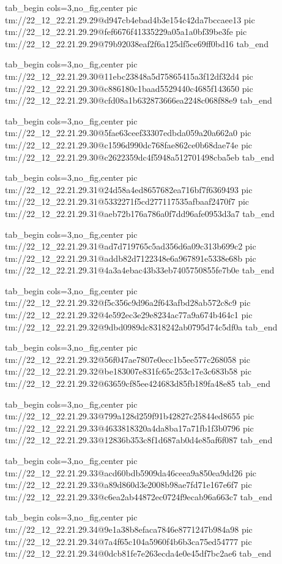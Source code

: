 \ifcmt
  tab_begin cols=3,no_fig,center
    pic tm://22_12_22.21.29.29@d947cb4ebad4b3e154c42da7bccaee13
    pic tm://22_12_22.21.29.29@fef6676f41335229a05a1a0bf39be3fe
    pic tm://22_12_22.21.29.29@79b92038eaf2f6a125df5ce69ff0bd16
  tab_end
\fi


\ifcmt
  tab_begin cols=3,no_fig,center
    pic tm://22_12_22.21.29.30@11ebc23848a5d75865415a3f12df32d4
    pic tm://22_12_22.21.29.30@c886180c1baad5529440c4685f143650
    pic tm://22_12_22.21.29.30@cfd08a1b632873666ea2248c068f88e9
  tab_end
\fi


\ifcmt
  tab_begin cols=3,no_fig,center
    pic tm://22_12_22.21.29.30@5fae63ceef33307edbda059a20a662a0
    pic tm://22_12_22.21.29.30@c1596d990dc768fae862ce0b68dae74e
    pic tm://22_12_22.21.29.30@c2622359dc4f5948a512701498cba5eb
  tab_end
\fi


\ifcmt
  tab_begin cols=3,no_fig,center
    pic tm://22_12_22.21.29.31@24d58a4ed8657682ea716bf7f6369493
    pic tm://22_12_22.21.29.31@5332271f5cd277117535afbaaf2470f7
    pic tm://22_12_22.21.29.31@aeb72b176a786a0f7dd96afe0953d3a7
  tab_end
\fi


\ifcmt
  tab_begin cols=3,no_fig,center
    pic tm://22_12_22.21.29.31@ad7d719765c5ad356d6a09c313b699c2
    pic tm://22_12_22.21.29.31@addb82d7122348e6a967891e5338e68b
    pic tm://22_12_22.21.29.31@4a3a4ebac43b33eb7405750855fe7b0e
  tab_end
\fi


\ifcmt
  tab_begin cols=3,no_fig,center
    pic tm://22_12_22.21.29.32@f5c356c9d96a2f643afbd28ab572c8c9
    pic tm://22_12_22.21.29.32@4e592ec3e29e8234ac77a9a674b464c1
    pic tm://22_12_22.21.29.32@9dbd0989dc8318242ab0795d74c5df0a
  tab_end
\fi


\ifcmt
  tab_begin cols=3,no_fig,center
    pic tm://22_12_22.21.29.32@56f047ae7807e0ecc1b5ee577c268058
    pic tm://22_12_22.21.29.32@be183007e831fc65c253c17e3c683b58
    pic tm://22_12_22.21.29.32@63659cf85ee424683d85fb189fa48e85
  tab_end
\fi


\ifcmt
  tab_begin cols=3,no_fig,center
    pic tm://22_12_22.21.29.33@799a128d259f91b42827c25844ed8655
    pic tm://22_12_22.21.29.33@4633818320a4da8ba17a71fb1f3b0796
    pic tm://22_12_22.21.29.33@12836b353c8f1d687ab0d4e85af6f087
  tab_end
\fi


\ifcmt
  tab_begin cols=3,no_fig,center
    pic tm://22_12_22.21.29.33@acd60bdb5909da46ceea9a850ea9dd26
    pic tm://22_12_22.21.29.33@a89d860d3e2008b98ae7fd71e167e6f7
    pic tm://22_12_22.21.29.33@c6ea2ab44872ec0724f9ecab96a663c7
  tab_end
\fi


\ifcmt
  tab_begin cols=3,no_fig,center
    pic tm://22_12_22.21.29.34@9e1a38b8efaca7846e8771247b984a98
    pic tm://22_12_22.21.29.34@7a4f65c104a5960f4b6b3ca75ed54777
    pic tm://22_12_22.21.29.34@0dcb81fe7e263ecda4e0e45df7bc2ae6
  tab_end
\fi


